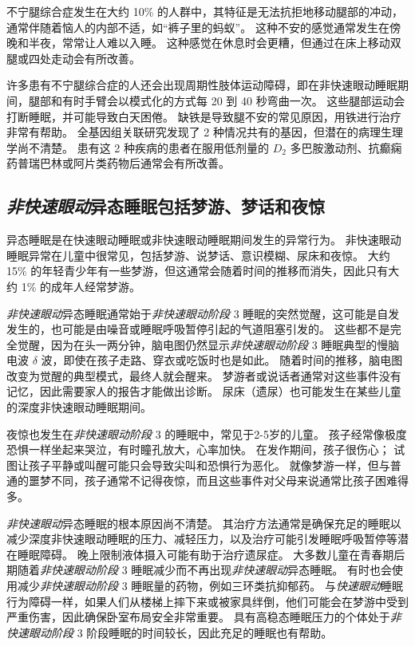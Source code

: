 不宁腿综合症发生在大约 10\% 的人群中，其特征是无法抗拒地移动腿部的冲动，通常伴随着恼人的内部不适，如“裤子里的蚂蚁”。
这种不安的感觉通常发生在傍晚和半夜，常常让人难以入睡。
这种感觉在休息时会更糟，但通过在床上移动双腿或四处走动会有所改善。


许多患有不宁腿综合症的人还会出现周期性肢体运动障碍，即在非快速眼动睡眠期间，腿部和有时手臂会以模式化的方式每 20 到 40 秒弯曲一次。
这些腿部运动会打断睡眠，并可能导致白天困倦。
缺铁是导致腿不安的常见原因，用铁进行治疗非常有帮助。
全基因组关联研究发现了 2 种情况共有的基因，但潜在的病理生理学尚不清楚。
患有这 2 种疾病的患者在服用低剂量的 $D_2$ 多巴胺激动剂、抗癫痫药普瑞巴林或阿片类药物后通常会有所改善。



\subsection{\textit{非快速眼动}异态睡眠包括梦游、梦话和夜惊}

异态睡眠是在快速眼动睡眠或非快速眼动睡眠期间发生的异常行为。
非快速眼动睡眠异常在儿童中很常见，包括梦游、说梦话、意识模糊、尿床和夜惊。
大约 15\% 的年轻青少年有一些梦游，但这通常会随着时间的推移而消失，因此只有大约 1\% 的成年人经常梦游。


\textit{非快速眼动}异态睡眠通常始于\textit{非快速眼动阶段} 3 睡眠的突然觉醒，这可能是自发发生的，也可能是由噪音或睡眠呼吸暂停引起的气道阻塞引发的。
这些都不是完全觉醒，因为在头一两分钟，脑电图仍然显示\textit{非快速眼动阶段} 3 睡眠典型的慢脑电波 $ \delta $ 波，即使在孩子走路、穿衣或吃饭时也是如此。
随着时间的推移，脑电图改变为觉醒的典型模式，最终人就会醒来。
梦游者或说话者通常对这些事件没有记忆，因此需要家人的报告才能做出诊断。
尿床（遗尿）也可能发生在某些儿童的深度非快速眼动睡眠期间。


夜惊也发生在\textit{非快速眼动阶段} 3 的睡眠中，常见于2-5岁的儿童。
孩子经常像极度恐惧一样坐起来哭泣，有时瞳孔放大，心率加快。
在发作期间，孩子很伤心；
试图让孩子平静或叫醒可能只会导致尖叫和恐惧行为恶化。
就像梦游一样，但与普通的噩梦不同，孩子通常不记得夜惊，而且这些事件对父母来说通常比孩子困难得多。


\textit{非快速眼动}异态睡眠的根本原因尚不清楚。
其治疗方法通常是确保充足的睡眠以减少深度非快速眼动睡眠的压力、减轻压力，以及治疗可能引发睡眠呼吸暂停等潜在睡眠障碍。
晚上限制液体摄入可能有助于治疗遗尿症。
大多数儿童在青春期后期随着\textit{非快速眼动阶段} 3 睡眠减少而不再出现\textit{非快速眼动}异态睡眠。
有时也会使用减少\textit{非快速眼动阶段} 3 睡眠量的药物，例如三环类抗抑郁药。
与\textit{快速眼动}睡眠行为障碍一样，如果人们从楼梯上摔下来或被家具绊倒，他们可能会在梦游中受到严重伤害，因此确保卧室布局安全非常重要。
具有高稳态睡眠压力的个体处于\textit{非快速眼动阶段} 3 阶段睡眠的时间较长，因此充足的睡眠也有帮助。



